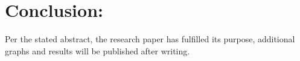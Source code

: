 \documentclass[10pt]{article}
\theoremstyle{plain}
\theoremstyle{definition}
\theoremstyle{remark}
\begin{document}
\section{Conclusion:}

Per the stated abstract, the research paper has fulfilled its purpose, additional graphs and results will be published after writing.

\nocite{*}



\end{document}
